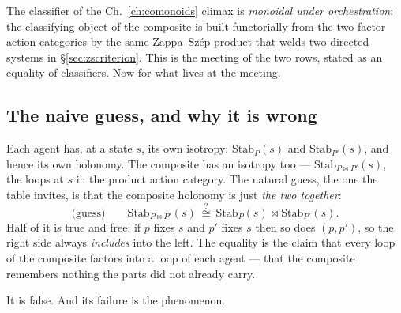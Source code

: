 \documentclass[11pt,a4paper]{book}
\theoremstyle{plain}
\theoremstyle{definition}
\theoremstyle{remark}
\begin{document}
The classifier of the Ch.~\ref{ch:comonoids} climax is \emph{monoidal under
orchestration}: the classifying object of the composite is built functorially from the
two factor action categories by the same Zappa--Sz\'ep product that welds two directed
systems in \S\ref{sec:zscriterion}. This is the meeting of the two rows, stated as an
equality of classifiers. Now for what lives at the meeting.

\subsection*{The naive guess, and why it is wrong}

Each agent has, at a state $s$, its own isotropy: $\mathrm{Stab}_{P}(s)$ and
$\mathrm{Stab}_{P'}(s)$, and hence its own holonomy. The composite has an isotropy too
--- $\mathrm{Stab}_{P\bowtie P'}(s)$, the loops at $s$ in the product action category.
The natural guess, the one the table invites, is that the composite holonomy is just
\emph{the two together}:
\[
   \text{(guess)}\qquad
   \mathrm{Stab}_{P\bowtie P'}(s)\ \overset{?}{\cong}\
   \mathrm{Stab}_{P}(s)\bowtie\mathrm{Stab}_{P'}(s).
\]
Half of it is true and free: if $p$ fixes $s$ and $p'$ fixes $s$ then so does $(p,p')$,
so the right side always \emph{includes} into the left. The equality is the claim that
every loop of the composite factors into a loop of each agent --- that the composite
remembers nothing the parts did not already carry.

It is false. And its failure is the phenomenon.
\end{document}
